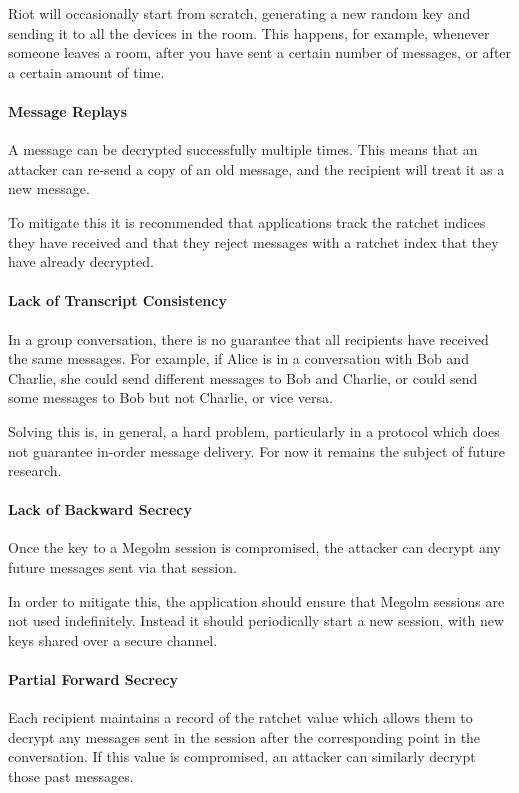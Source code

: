Riot will occasionally start from scratch, generating a new random key and sending it to all the devices in the room. This happens, for example, whenever someone leaves a room, after you have sent a certain number of messages, or after a certain amount of time.

\paragraph{Message Replays}
A message can be decrypted successfully multiple times. This means that an attacker can re-send a copy of an old message, and the recipient will treat it as a new message.

To mitigate this it is recommended that applications track the ratchet indices they have received and that they reject messages with a ratchet index that they have already decrypted.

\paragraph{Lack of Transcript Consistency}
In a group conversation, there is no guarantee that all recipients have received the same messages. For example, if Alice is in a conversation with Bob and Charlie, she could send different messages to Bob and Charlie, or could send some messages to Bob but not Charlie, or vice versa.

Solving this is, in general, a hard problem, particularly in a protocol which does not guarantee in-order message delivery. For now it remains the subject of future research.

\paragraph{Lack of Backward Secrecy}
Once the key to a Megolm session is compromised, the attacker can decrypt any future messages sent via that session.

In order to mitigate this, the application should ensure that Megolm sessions are not used indefinitely. Instead it should periodically start a new session, with new keys shared over a secure channel.

\paragraph{Partial Forward Secrecy}
Each recipient maintains a record of the ratchet value which allows them to decrypt any messages sent in the session after the corresponding point in the conversation. If this value is compromised, an attacker can similarly decrypt those past messages.

